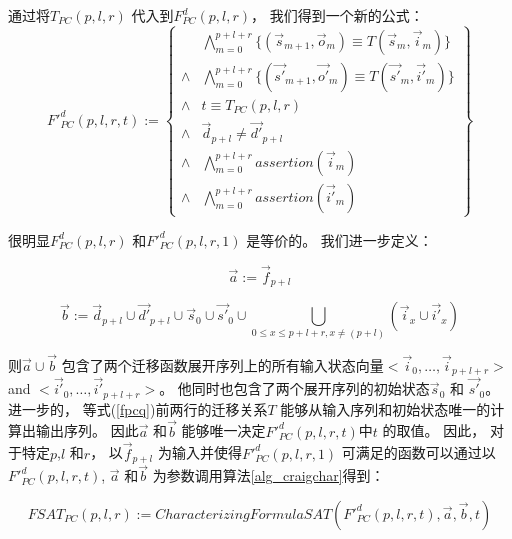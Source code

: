 通过将$T_{PC}(p,l,r)$ 代入到$F^d_{PC}(p,l,r)$，
我们得到一个新的公式：
\begin{equation}\label{fpcq}
F'^d_{PC}(p,l,r,t):=
\left\{
\begin{array}{cc}
&\bigwedge_{m=0}^{p+l+r}
\{
(\vec{s}_{m+1},\vec{o}_m)\equiv T(\vec{s}_m,\vec{i}_m)
\}
\\
\wedge&\bigwedge_{m=0}^{p+l+r}
\{
(\vec{s'}_{m+1},\vec{o'}_m)\equiv T(\vec{s'}_m,\vec{i'}_m)
\}
\\
\wedge& t\equiv T_{PC}(p,l,r)\\
\wedge& \vec{d}_{p+l}\ne \vec{d'}_{p+l} \\
\wedge&\bigwedge_{m=0}^{p+l+r}assertion(\vec{i}_m) \\
\wedge&\bigwedge_{m=0}^{p+l+r}assertion(\vec{i'}_m)
\end{array}
\right\}
\end{equation}


很明显$F^d_{PC}(p,l,r)$ 和$F'^d_{PC}(p,l,r,1)$ 是等价的。
我们进一步定义：

\begin{equation}\label{pcdef1}
\vec{a}:=\vec{f}_{p+l}
\end{equation}

\begin{equation}\label{pcdef2}
\vec{b}:=\vec{d}_{p+l}\cup \vec{d'}_{p+l}\cup \vec{s}_0\cup \vec{s'}_0\cup\bigcup_{0\le x\le p+l+r,x\neq (p+l)}(\vec{i}_{x}\cup\vec{i'}_{x})
\end{equation}

则$\vec{a}\cup\vec{b}$ 包含了两个迁移函数展开序列上的所有输入状态向量$<\vec{i}_0,\dots,\vec{i}_{p+l+r}>$ and $<\vec{i'}_0,\dots,\vec{i'}_{p+l+r}>$。
他同时也包含了两个展开序列的初始状态$\vec{s}_0$ 和 $\vec{s'}_0$。
进一步的，
等式(\ref{fpcq})前两行的迁移关系$T$
能够从输入序列和初始状态唯一的计算出输出序列。
因此$\vec{a}$ 和$\vec{b}$ 能够唯一决定$F'^d_{PC}(p,l,r,t)$中$t$ 的取值。
因此，
对于特定$p$,$l$ 和$r$，
以$\vec{f}_{p+l}$ 为输入并使得$F'^d_{PC}(p,l,r,1)$ 可满足的函数可以通过以$F'^d_{PC}(p,l,r,t)$, $\vec{a}$ 和$\vec{b}$ 为参数调用算法\ref{alg_craigchar}得到：

\begin{equation}\label{fsat_pc}
FSAT_{PC}(p,l,r):=CharacterizingFormulaSAT(F'^d_{PC}(p,l,r,t),\vec{a},\vec{b},t)
\end{equation}

